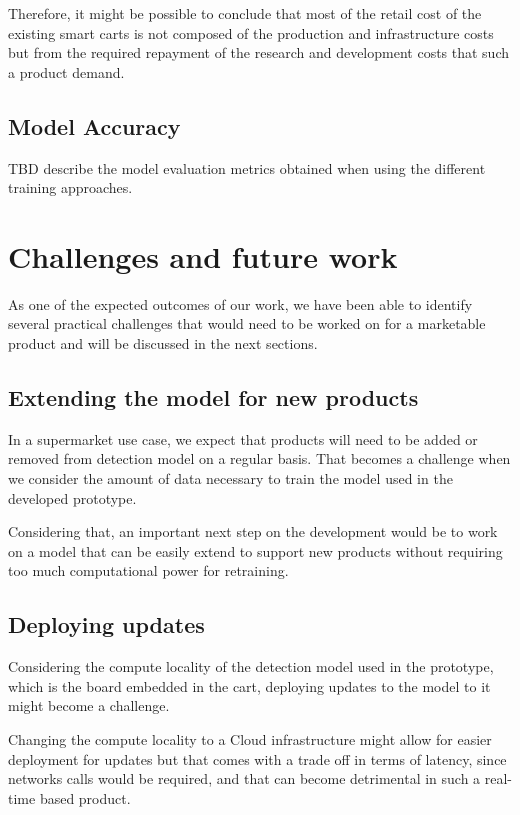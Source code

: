 \documentclass[openright]{normas-utf-tex} %
\begin{document}
Therefore, it might be possible to conclude that most of the retail cost of the
existing smart carts is not composed of the production and infrastructure costs
but from the required repayment of the research and development costs that such
a product demand.

\subsection{Model Accuracy}

TBD describe the model evaluation metrics obtained when using the different training approaches.

\section{Challenges and future work}

As one of the expected outcomes of our work, we have been able to identify
several practical challenges that would need to be worked on for a marketable
product and will be discussed in the next sections.

\subsection{Extending the model for new products}
In a supermarket use case, we expect that products will need to be added or
removed from detection model on a regular basis. That becomes a challenge when
we consider the amount of data necessary to train the model used in the
developed prototype.

Considering that, an important next step on the development would be to work on
a model that can be easily extend to support new products without requiring too
much computational power for retraining.

\subsection{Deploying updates}

Considering the compute locality of the detection model used in the prototype,
which is the board embedded in the cart, deploying updates to the model to it
might become a challenge.

Changing the compute locality to  a Cloud infrastructure \cite{Aws2022} might
allow for easier deployment for updates but that comes with a trade off in
terms of latency, since networks calls would be required, and that can become
detrimental in such a real-time based product.
\end{document}
